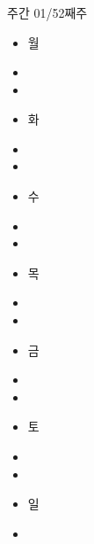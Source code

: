 \documentclass[aspectratio=1610,20pt,xcolor=pdftex,dvipsnames,table,handout]{beamer}
\begin{document}
		\begin{frame} [t,plain]
		\frametitle{}
			\begin{block} {주간 01/52째주 } %
			\setlength{\leftmargini}{1em}			
			\begin{itemize}
				\item 월	\hrulefill
				\item \hrulefill
				\item \hrulefill
				\item 화 \hrulefill
				\item \hrulefill
				\item \hrulefill
				\item 수 \hrulefill
				\item \hrulefill
				\item \hrulefill
				\item 목 \hrulefill
				\item \hrulefill
				\item \hrulefill
				\item 금 \hrulefill
				\item \hrulefill
				\item \hrulefill
				\item 토 \hrulefill
				\item \hrulefill
				\item \hrulefill
				\item 일 \hrulefill
				\item \hrulefill
			\end{itemize}
			\end{block}			
								
		\end{frame}						
		
\end{document}
